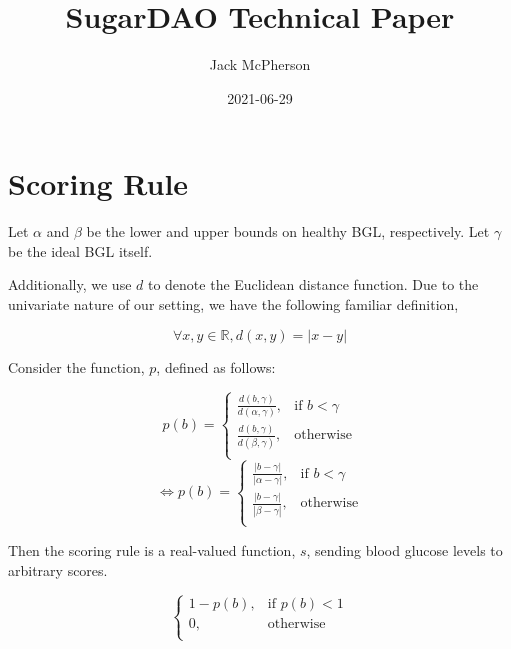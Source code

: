 \documentclass[oneside,a4paper]{article}
\theoremstyle{remark}
\begin{document}
   \title{SugarDAO Technical Paper}
    \author{Jack McPherson}
    \date{2021-06-29}
    \maketitle

    \section{Scoring Rule}
        Let \(\alpha\) and \(\beta\) be the lower and upper bounds on healthy BGL, respectively. Let \(\gamma\) be the ideal BGL itself.
        
        Additionally, we use \(d\) to denote the Euclidean distance function. Due to the univariate nature of our setting, we have the following familiar definition,

        \[
            \forall x, y\in\mathbb{R}, d\left(x, y\right)=|x-y|
        \]

        Consider the function, \(p\), defined as follows:

        \[
            p\left(b\right)=\left.
                \begin{cases}
                    \frac{d\left(b, \gamma\right)}{d\left(\alpha, \gamma\right)}, & \text{if } b<\gamma\\
                    \frac{d\left(b, \gamma\right)}{d\left(\beta, \gamma\right)}, & \text{otherwise}\\
                \end{cases}\right.
        \]
        \[
            \Leftrightarrow p\left(b\right)=\left.
                \begin{cases}
                    \frac{|b-\gamma|}{|\alpha-\gamma|}, & \text{if } b<\gamma\\
                    \frac{|b-\gamma|}{|\beta-\gamma|}, & \text{otherwise}\\
                \end{cases}\right.
        \]

        Then the scoring rule is a real-valued function, \(s\), sending blood glucose levels to arbitrary scores.

        \[
            \begin{cases}
                1-p\left(b\right), & \text{if } p\left(b\right)<1\\
                0, & \text{otherwise}\\
            \end{cases}
        \]
\end{document}
